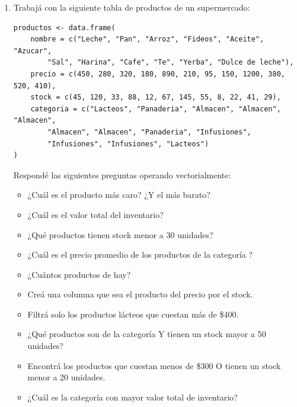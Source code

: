 \documentclass[8pt]{beamer}
\begin{document}
\begin{frame}[fragile]
	\begin{enumerate}[start=8]
			\item Trabajá con la siguiente tabla de productos de un supermercado:
		\begin{lstlisting}[style=RScript, numbers=none]
productos <- data.frame(
	nombre = c("Leche", "Pan", "Arroz", "Fideos", "Aceite", "Azucar", 
		"Sal", "Harina", "Cafe", "Te", "Yerba", "Dulce de leche"),
	precio = c(450, 280, 320, 180, 890, 210, 95, 150, 1200, 380, 520, 410),
	stock = c(45, 120, 33, 88, 12, 67, 145, 55, 8, 22, 41, 29),
	categoria = c("Lacteos", "Panaderia", "Almacen", "Almacen", "Almacen", 
		"Almacen", "Almacen", "Panaderia", "Infusiones", 
		"Infusiones", "Infusiones", "Lacteos")
)
\end{lstlisting}
		Respondé las siguientes preguntas operando vectorialmente:
		\begin{itemize}
			\item ¿Cuál es el producto más caro? ¿Y el más barato?
			\item ¿Cuál es el valor total del inventario? 
			\item ¿Qué productos tienen stock menor a 30 unidades?
			\item ¿Cuál es el precio promedio de los productos de la categoría  ?
			\item ¿Cuántos productos de   hay?
			\item Creá una columna  que sea el producto del precio por el stock.
			\item Filtrá solo los productos lácteos que cuestan más de \$400.
			\item ¿Qué productos son de la categoría   Y tienen un stock mayor a 50 unidades?
			\item Encontrá los productos que cuestan menos de \$300 O tienen un stock menor a 20 unidades.
			\item ¿Cuál es la categoría con mayor valor total de inventario?
		\end{itemize}
	\end{enumerate}
\end{frame}
\end{document}
